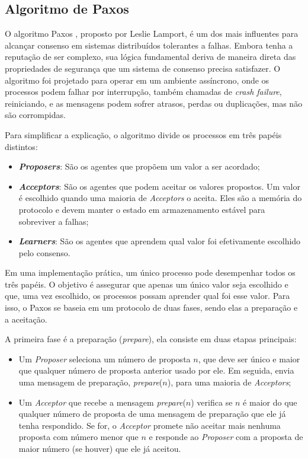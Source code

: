     \subsection{Algoritmo de Paxos}

        O algoritmo Paxos \cite{lamport2001paxos}, proposto por Leslie Lamport, é um dos mais influentes para alcançar consenso em sistemas distribuídos tolerantes a falhas. Embora tenha a reputação de ser complexo, sua lógica fundamental deriva de maneira direta das propriedades de segurança que um sistema de consenso precisa satisfazer. O algoritmo foi projetado para operar em um ambiente assíncrono, onde os processos podem falhar por interrupção, também chamadas de \textit{crash failure}, reiniciando, e as mensagens podem sofrer atrasos, perdas ou duplicações, mas não são corrompidas.

        Para simplificar a explicação, o algoritmo divide os processos em três papéis distintos:

        \begin{itemize}
            \item \textbf{\textit{Proposers}}: São os agentes que propõem um valor a ser acordado;
            
            \item \textbf{\textit{Acceptors}}: São os agentes que podem aceitar os valores propostos. Um valor é escolhido quando uma maioria de \textit{Acceptors} o aceita. Eles são a memória do protocolo e devem manter o estado em armazenamento estável para sobreviver a falhas;
            
            \item \textbf{\textit{Learners}}: São os agentes que aprendem qual valor foi efetivamente escolhido pelo consenso.
        \end{itemize}

        Em uma implementação prática, um único processo pode desempenhar todos os três papéis. O objetivo é assegurar que apenas um único valor seja escolhido e que, uma vez escolhido, os processos possam aprender qual foi esse valor. Para isso, o Paxos se baseia em um protocolo de duas fases, sendo elas a preparação e a aceitação.

        A primeira fase é a preparação (\textit{prepare}), ela consiste em duas etapas principais:
        \begin{itemize}
            \item Um \textit{Proposer} seleciona um número de proposta $n$, que deve ser único e maior que qualquer número de proposta anterior usado por ele. Em seguida, envia uma mensagem de preparação, \textit{prepare}($n$), para uma maioria de \textit{Acceptors};
            
            \item Um \textit{Acceptor} que recebe a mensagem \textit{prepare}($n$) verifica se $n$ é maior do que qualquer número de proposta de uma mensagem de preparação que ele já tenha respondido. Se for, o \textit{Acceptor} promete não aceitar mais nenhuma proposta com número menor que $n$ e responde ao \textit{Proposer} com a proposta de maior número (se houver) que ele já aceitou.
        \end{itemize}

